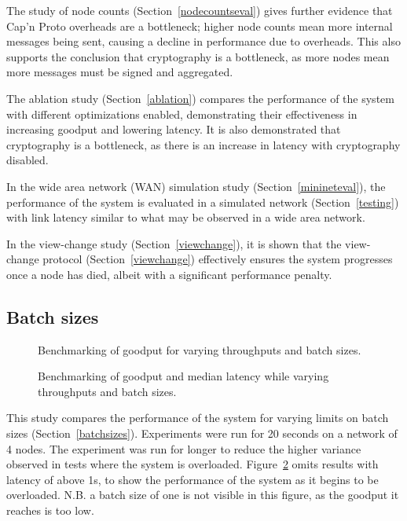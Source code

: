 The study of node counts (Section~\ref{nodecountseval}) gives further evidence that Cap'n Proto overheads are a bottleneck; higher node counts mean more internal messages being sent, causing a decline in performance due to overheads. This also supports the conclusion that cryptography is a bottleneck, as more nodes mean more messages must be signed and aggregated.

The ablation study (Section~\ref{ablation}) compares the performance of the system with different optimizations enabled, demonstrating their effectiveness in increasing goodput and lowering latency. It is also demonstrated that cryptography is a bottleneck, as there is an increase in latency with cryptography disabled.

In the wide area network (WAN) simulation study (Section~\ref{minineteval}), the performance of the system is evaluated in a simulated network (Section~\ref{testing}) with link latency similar to what may be observed in a wide area network.

In the view-change study (Section~\ref{viewchange}), it is shown that the view-change protocol (Section~\ref{viewchange}) effectively ensures the system progresses once a node has died, albeit with a significant performance penalty.

\subsection{Batch sizes} \label{batchsizeseval}

\begin{figure}[h!]
\centering
\resizebox{.6\textwidth}{!}{}
\caption{Benchmarking of goodput for varying throughputs and batch sizes.}
\label{throughputgoodputbatch}
\end{figure}

\begin{figure}[h!]
\centering
\resizebox{.6\textwidth}{!}{}
\caption{Benchmarking of goodput and median latency while varying throughputs and batch sizes.}
\label{goodputlatencybatch}
\end{figure}

This study compares the performance of the system for varying limits on batch sizes (Section~\ref{batchsizes}). Experiments were run for 20 seconds on a network of 4 nodes. The experiment was run for longer to reduce the higher variance observed in tests where the system is overloaded. Figure~\ref{goodputlatencybatch} omits results with latency of above 1s, to show the performance of the system as it begins to be overloaded. N.B. a batch size of one is not visible in this figure, as the goodput it reaches is too low.

